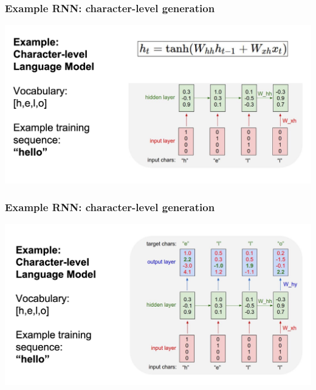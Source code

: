 \documentclass[aspectratio=1610]{beamer} %
\begin{document}
\begin{frame}

\frametitle{Example RNN: character-level generation}

\begin{center}
\includegraphics[width=\textwidth]{pics/example2}
\end{center}

\end{frame}


\begin{frame}

\frametitle{Example RNN: character-level generation}

\begin{center}
\includegraphics[width=\textwidth]{pics/example3}
\end{center}

\end{frame}
\end{document}
